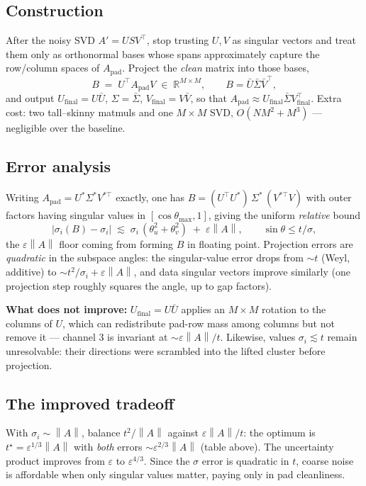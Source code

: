 \documentclass[11pt]{article}
\newcommand{\R}{\mathbb{R}}
\newcommand{\Apad}{A_{\mathrm{pad}}}
\newcommand{\norm}[1]{\left\lVert #1 \right\rVert}
\begin{document}
\subsection*{Construction}

After the noisy SVD $A' = U S V^{\top}$, stop trusting $U, V$ as singular
vectors and treat them only as orthonormal bases whose spans approximately
capture the row/column spaces of $\Apad$. Project the \emph{clean} matrix into
those bases,
\[
  B \;=\; U^{\top} \Apad V \;\in\; \R^{M \times M},
  \qquad
  B = \bar{U} \bar{\Sigma} \bar{V}^{\top},
\]
and output $U_{\mathrm{final}} = U\bar U$, $\Sigma = \bar\Sigma$,
$V_{\mathrm{final}} = V\bar V$, so that
$\Apad \approx U_{\mathrm{final}} \bar\Sigma V_{\mathrm{final}}^{\top}$.
Extra cost: two tall--skinny matmuls and one $M \times M$ SVD,
$O(NM^2 + M^3)$ --- negligible over the baseline.

\subsection*{Error analysis}

Writing $\Apad = U^*\Sigma^* V^{*\top}$ exactly, one has
$B = (U^{\top}U^*)\,\Sigma^*\,(V^{*\top}V)$ with outer factors having singular
values in $[\cos\theta_{\max}, 1]$, giving the uniform \emph{relative} bound
\[
  |\sigma_i(B) - \sigma_i| \;\lesssim\; \sigma_i\,(\theta_u^2 + \theta_v^2)
  \;+\; \varepsilon\norm{A},
  \qquad \sin\theta \le t/\sigma,
\]
the $\varepsilon\norm{A}$ floor coming from forming $B$ in floating point.
Projection errors are \emph{quadratic} in the subspace angles: the
singular-value error drops from $\sim t$ (Weyl, additive) to
$\sim t^2/\sigma_i + \varepsilon\norm{A}$, and data singular vectors improve
similarly (one projection step roughly squares the angle, up to gap factors).

\textbf{What does not improve:} $U_{\mathrm{final}} = U\bar U$ applies an
$M \times M$ rotation to the columns of $U$, which can redistribute pad-row
mass among columns but not remove it --- channel 3 is invariant at
$\sim \varepsilon\norm{A}/t$. Likewise, values $\sigma_i \lesssim t$ remain
unresolvable: their directions were scrambled into the lifted cluster before
projection.

\subsection*{The improved tradeoff}

With $\sigma_i \sim \norm{A}$, balance $t^2/\norm{A}$ against
$\varepsilon\norm{A}/t$: the optimum is $t^\star = \varepsilon^{1/3}\norm{A}$
with \emph{both} errors $\sim \varepsilon^{2/3}\norm{A}$ (table above). The
uncertainty product improves from $\varepsilon$ to $\varepsilon^{4/3}$. Since
the $\sigma$ error is quadratic in $t$, coarse noise is affordable when only
singular values matter, paying only in pad cleanliness.
\end{document}
